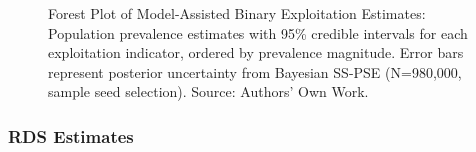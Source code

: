 \documentclass[
  12pt,
  letterpaper,
  DIV=11,
  numbers=noendperiod]{scrartcl}
\theoremstyle{plain}
\theoremstyle{definition}
\begin{document}
\begin{figure}[H]


\caption{\label{fig-ma-binary-forest}Forest Plot of Model-Assisted
Binary Exploitation Estimates: Population prevalence estimates with 95\%
credible intervals for each exploitation indicator, ordered by
prevalence magnitude. Error bars represent posterior uncertainty from
Bayesian SS-PSE (N=980,000, sample seed selection). Source: Authors' Own
Work.}

\end{figure}%

\subsubsection{RDS Estimates}\label{rds-estimates}
\end{document}
